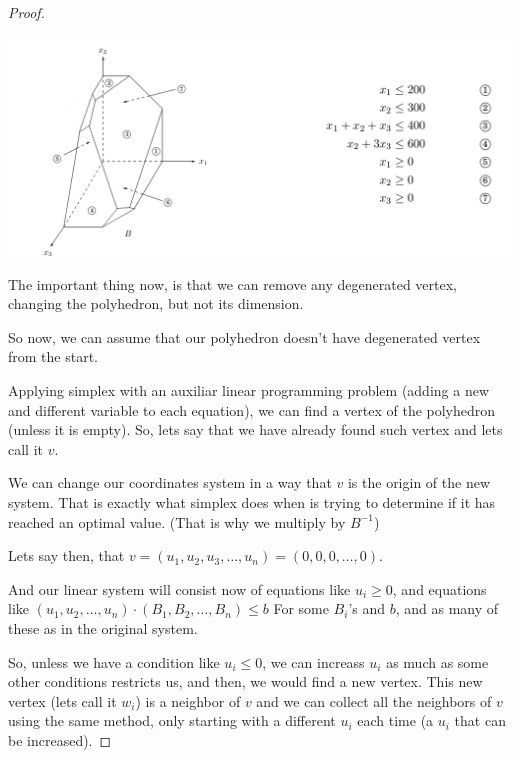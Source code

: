 \begin{proof}
        \begin{center}
            \includegraphics[width=14cm]{PolyhedronDimension/DegeneratedVertex2.png}%
        \end{center}\pn
        
        The important thing now, is that we can remove any degenerated vertex, changing the polyhedron, but not
        its dimension.\pn
        
        So now, we can assume that our polyhedron doesn't have degenerated vertex from the start.\pn
        
        Applying simplex with an auxiliar linear programming problem (adding a new and different variable to each equation),
        we can find a vertex of the polyhedron (unless it is empty). So, lets say that we have already found such vertex and
        lets call it $v$.\pn
        
        We can change our coordinates system in a way that $v$ is the origin of the new system. That is exactly what simplex does
        when is trying to determine if it has reached an optimal value. (That is why we multiply by $B^{-1}$)\pn
        
        Lets say then, that $v = (u_1, u_2, u_3, \dots, u_n) = (0, 0, 0, \dots, 0)$. 
        
        And our linear system will consist now of equations like $u_i \geq 0$, and equations like $(u_1, u_2, \dots, u_n) \cdot (B_1, B_2, \dots, B_n) \leq b$
        For some $B_i$'s and $b$, and as many of these as in the original system.\pn
        
        So, unless we have a condition like $u_i \leq 0$, we can increass $u_i$ as much as some other conditions restricts us, and then, we
        would find a new vertex. This new vertex (lets call it $w_i$) is a neighbor of $v$ and we can collect all the neighbors of $v$ 
        using the same method, only starting with a different $u_i$ each time (a $u_i$ that can be increased).\pn
        

\end{proof}
